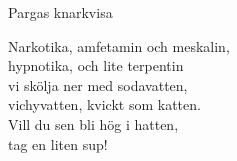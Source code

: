 \begin{song}{Pargas knarkvisa}
	
	
	Narkotika, amfetamin och meskalin,\\
	hypnotika, och lite terpentin\\
	vi skölja ner med sodavatten,\\
	vichyvatten, kvickt som katten.\\
	Vill du sen bli hög i hatten,\\
	tag en liten sup!
	
\end{song}
